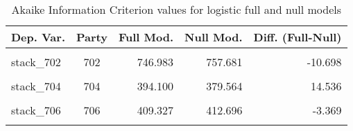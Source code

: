 \documentclass[
]{article}
\begin{document}
\begin{table}[!h]

\caption{\label{tab:unnamed-chunk-48}Akaike Information Criterion values for logistic full and null models 
        \label{table:logit_aic_dk}}
\centering
\begin{tabular}[t]{lcrrr}
\toprule
Dep. Var. & Party & Full Mod. & Null Mod. & Diff. (Full-Null)\\
\midrule
\cellcolor{gray!6}{stack\_701} & \cellcolor{gray!6}{701} & \cellcolor{gray!6}{757.463} & \cellcolor{gray!6}{771.073} & \cellcolor{gray!6}{-13.610}\\
stack\_702 & 702 & 746.983 & 757.681 & -10.698\\
\cellcolor{gray!6}{stack\_703} & \cellcolor{gray!6}{703} & \cellcolor{gray!6}{591.403} & \cellcolor{gray!6}{602.927} & \cellcolor{gray!6}{-11.523}\\
stack\_704 & 704 & 394.100 & 379.564 & 14.536\\
\cellcolor{gray!6}{stack\_705} & \cellcolor{gray!6}{705} & \cellcolor{gray!6}{524.266} & \cellcolor{gray!6}{523.116} & \cellcolor{gray!6}{1.150}\\
\addlinespace
stack\_706 & 706 & 409.327 & 412.696 & -3.369\\
\cellcolor{gray!6}{stack\_707} & \cellcolor{gray!6}{707} & \cellcolor{gray!6}{316.348} & \cellcolor{gray!6}{314.621} & \cellcolor{gray!6}{1.727}\\
\bottomrule
\end{tabular}
\end{table}
\end{document}

